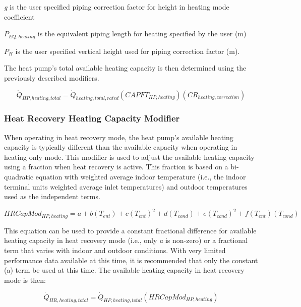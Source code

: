 \emph{g} is the user specified piping correction factor for height in heating mode coefficient

\(P_{EQ,heating}\) is the equivalent piping length for heating specified by the user (m)

\(P_H\) is the user specified vertical height used for piping correction factor (m).

The heat pump's total available heating capacity is then determined using the previously described modifiers.

\begin{equation}
  \dot{Q}_{HP,heating,total} = \dot{Q}_{heating,total,rated} \left( CAPFT_{HP,heating} \right) \left( CR_{heating,correction} \right)
\end{equation}

\subsubsection{Heat Recovery Heating Capacity Modifier}\label{heat-recovery-heating-capacity-modifier}

When operating in heat recovery mode, the heat pump's available heating capacity is typically different than the available capacity when operating in heating only mode. This modifier is used to adjust the available heating capacity using a fraction when heat recovery is active. This fraction is based on a bi-quadratic equation with weighted average indoor temperature (i.e., the indoor terminal units weighted average inlet temperatures) and outdoor temperatures used as the independent terms.

\begin{equation}
HRCapMod_{HP,heating} = a + b \left( T_{ent} \right) + c \left( T_{ent} \right)^2 + d \left( T_{cond} \right) + e \left( T_{cond} \right)^2 + f \left( T_{ent} \right) \left( T_{cond} \right)
\end{equation}

This equation can be used to provide a constant fractional difference for available heating capacity in heat recovery mode (i.e., only \emph{a} is non-zero) or a fractional term that varies with indoor and outdoor conditions. With very limited performance data available at this time, it is recommended that only the constant (a) term be used at this time. The available heating capacity in heat recovery mode is then:

\begin{equation}
  \dot{Q}_{HR,heating,total} = \dot{Q}_{HP,heating,total} \left( HRCapMod_{HP,heating} \right)
\end{equation}

